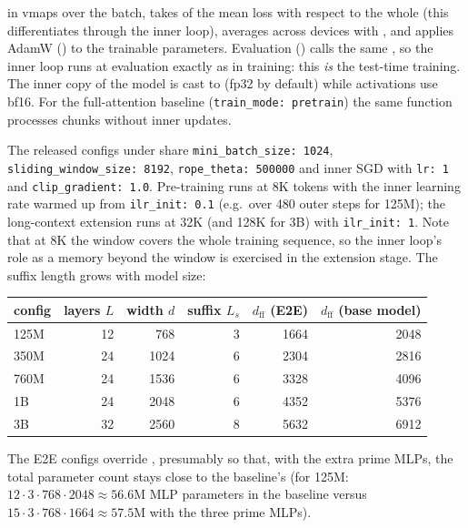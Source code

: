 \begin{implnote}[title={In the code: the outer loop and the configs}]
 in  vmaps  over
the batch, takes  of the mean loss with respect to the whole
 (this differentiates through the inner loop), averages across devices with
, and applies AdamW () to the trainable parameters.
Evaluation () calls the same , so the inner loop
runs at evaluation exactly as in training: this \emph{is} the test-time training. The inner
copy of the model is cast to  (fp32 by default) while activations use bf16.
For the full-attention baseline (\texttt{train\_mode: pretrain}) the same function processes
chunks without inner updates.

The released configs under  share \texttt{mini\_batch\_size: 1024},
\texttt{sliding\_window\_size: 8192}, \texttt{rope\_theta: 500000} and inner SGD with \texttt{lr: 1} and
\texttt{clip\_gradient: 1.0}. Pre-training runs at 8K tokens with the inner learning rate warmed
up from \texttt{ilr\_init: 0.1} (e.g.\ over 480 outer steps for 125M); the long-context extension
runs at 32K (and 128K for 3B) with \texttt{ilr\_init: 1}. Note that at 8K the window covers the
whole training sequence, so the inner loop's role as a memory beyond the window is exercised in
the extension stage. The suffix length grows with model size:
\end{implnote}

\begin{center}\small
\begin{tabular}{@{}lrrrrr@{}}
\toprule
config & layers $L$ & width $d$ & suffix $L_s$ & $d_{\text{ff}}$ (E2E) & $d_{\text{ff}}$ (base model) \\
\midrule
125M & 12 & 768 & 3 & 1664 & 2048 \\
350M & 24 & 1024 & 6 & 2304 & 2816 \\
760M & 24 & 1536 & 6 & 3328 & 4096 \\
1B & 24 & 2048 & 6 & 4352 & 5376 \\
3B & 32 & 2560 & 8 & 5632 & 6912 \\
\bottomrule
\end{tabular}
\end{center}
The E2E configs override , presumably so that, with the extra prime
MLPs, the total parameter count stays close to the baseline's (for 125M:
$12\cdot 3\cdot 768\cdot 2048 \approx 56.6$M MLP parameters in the baseline versus
$15\cdot 3\cdot 768\cdot 1664 \approx 57.5$M with the three prime MLPs).

